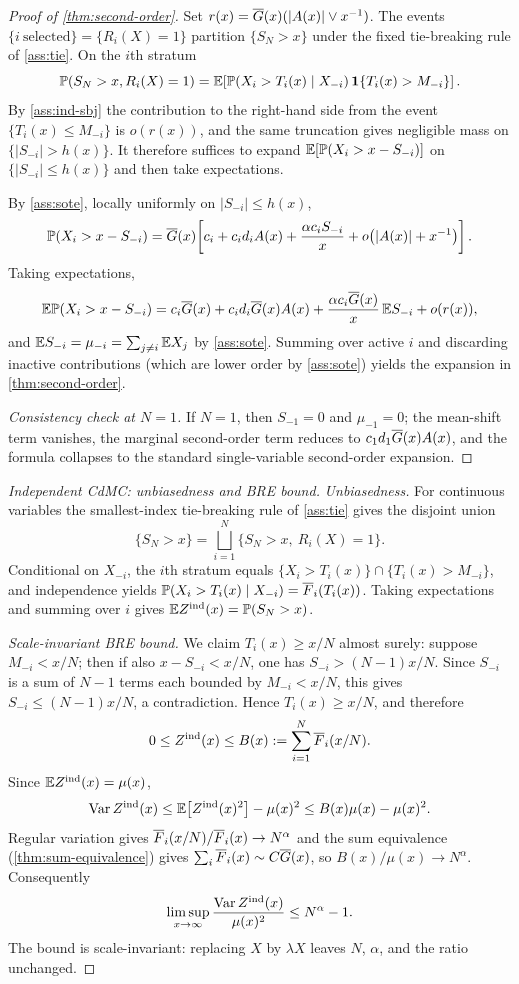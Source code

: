 \begin{proof}[Proof of \cref{thm:second-order}]
Set \(r(x)=\overline{G}(x)(|A(x)|\vee x^{-1})\). The events
\(\{i\ \text{selected}\}=\{R_i(X)=1\}\) partition \(\{S_N>x\}\) under the fixed
tie-breaking rule of \cref{ass:tie}. On the \(i\)th stratum
\[
  \mathbb{P}(S_N>x, R_i(X)=1)
  =\mathbb{E}\!\left[\mathbb{P}(X_i>T_i(x)\mid X_{-i})\,\mathbf{1}\{T_i(x)>M_{-i}\}\right].
\]
By \cref{ass:ind-sbj} the contribution to the right-hand side from the event
\(\{T_i(x)\le M_{-i}\}\) is \(o(r(x))\), and the same truncation gives
negligible mass on \(\{|S_{-i}|>h(x)\}\). It therefore suffices to expand
\(\mathbb{E}[\mathbb{P}(X_i>x-S_{-i})]\) on \(\{|S_{-i}|\le h(x)\}\) and then take
expectations.

By \cref{ass:sote}, locally uniformly on \(|S_{-i}|\le h(x)\),
\[
  \mathbb{P}(X_i>x-S_{-i})
  =\overline{G}(x)\!\left[c_i+c_id_iA(x)+\frac{\alpha c_iS_{-i}}{x}
  + o\!\left(|A(x)|+x^{-1}\right)\right].
\]
Taking expectations,
\[
  \mathbb{E}\mathbb{P}(X_i>x-S_{-i})
  = c_i\overline{G}(x)+c_id_i\overline{G}(x)A(x)
  + \frac{\alpha c_i\overline{G}(x)}{x}\,\mathbb{E} S_{-i}
  + o(r(x)),
\]
and \(\mathbb{E} S_{-i}=\mu_{-i}=\sum_{j\ne i}\mathbb{E} X_j\) by \cref{ass:sote}. Summing over
active \(i\) and discarding inactive contributions (which are lower order by
\cref{ass:sote}) yields the expansion in \cref{thm:second-order}.

\emph{Consistency check at \(N=1\).} If \(N=1\), then \(S_{-1}=0\) and
\(\mu_{-1}=0\); the mean-shift term vanishes, the marginal second-order term
reduces to \(c_1d_1\overline{G}(x)A(x)\), and the formula collapses to the standard
single-variable second-order expansion.
\end{proof}

\begin{proof}[Independent CdMC: unbiasedness and BRE bound]
\emph{Unbiasedness.} For continuous variables the smallest-index tie-breaking
rule of \cref{ass:tie} gives the disjoint union
\[
  \{S_N>x\}=\bigsqcup_{i=1}^N\{S_N>x,\ R_i(X)=1\}.
\]
Conditional on \(X_{-i}\), the \(i\)th stratum equals
\(\{X_i>T_i(x)\}\cap\{T_i(x)>M_{-i}\}\), and independence yields
\(\mathbb{P}(X_i>T_i(x)\mid X_{-i})=\overline{F}_i(T_i(x))\). Taking expectations and summing
over \(i\) gives \(\mathbb{E} Z^{\mathrm{ind}}(x)=\mathbb{P}(S_N>x)\).

\emph{Scale-invariant BRE bound.} We claim \(T_i(x)\ge x/N\) almost surely:
suppose \(M_{-i}<x/N\); then if also \(x-S_{-i}<x/N\), one has
\(S_{-i}>(N-1)x/N\). Since \(S_{-i}\) is a sum of \(N-1\) terms each bounded by
\(M_{-i}<x/N\), this gives \(S_{-i}\le (N-1)x/N\), a contradiction. Hence
\(T_i(x)\ge x/N\), and therefore
\[
  0\le Z^{\mathrm{ind}}(x)\le B(x):=\sum_{i=1}^N\overline{F}_i(x/N).
\]
Since \(\mathbb{E} Z^{\mathrm{ind}}(x)=\mu(x)\),
\[
  \operatorname{Var} Z^{\mathrm{ind}}(x)
  \le \mathbb{E}\!\left[Z^{\mathrm{ind}}(x)^2\right]-\mu(x)^2
  \le B(x)\mu(x)-\mu(x)^2.
\]
Regular variation gives \(\overline{F}_i(x/N)/\overline{F}_i(x)\to N^\alpha\) and the sum
equivalence (\cref{thm:sum-equivalence}) gives \(\sum_i\overline{F}_i(x)\sim C\overline{G}(x)\),
so \(B(x)/\mu(x)\to N^\alpha\). Consequently
\[
  \limsup_{x\to\infty}\frac{\operatorname{Var} Z^{\mathrm{ind}}(x)}{\mu(x)^2}
  \le N^\alpha-1.
\]
The bound is scale-invariant: replacing \(X\) by \(\lambda X\) leaves \(N\),
\(\alpha\), and the ratio unchanged.
\end{proof}

